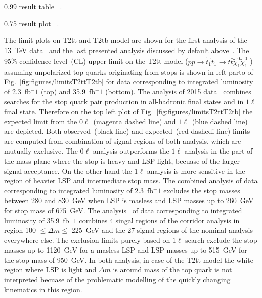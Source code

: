                  {0.99}       %
                 { result table ~\cite{Sirunyan:2017xse}. }

                 {0.75}       %
                 { result plot ~\cite{Sirunyan:2017xse}. }

The limit plots on T2tt and T2tb model are shown for the first analysis of the 13~TeV data~\cite{Sirunyan:2016jpr} and the last presented analysis discussed by default above~\cite{Sirunyan:2017xse}. The 95\% confidence level~(CL) upper limit on the T2tt model ($ pp \to \tilde{t}_{1} \bar{\tilde{t}}_{1} \to t \bar{t} \tilde{\chi}^{0}_{1} \tilde{\chi}^{0}_{1}$ ) assuming unpolarized top quarks originating from stops is shown in left parto of Fig.~\ref{fig:figures/limitsT2ttT2tb} for data corresponding to integrated luminosity of 2.3~fb$^-1$ (top) and 35.9~fb$^-1$ (bottom). The analysis of 2015 data~\cite{Sirunyan:2016jpr} combines searches for the stop quark pair production in all-hadronic final states and in $1\ell$ final state. Therefore on the top left plot of Fig.~\ref{fig:figures/limitsT2ttT2tb} the expected limit from the $0\ell$~(magenta dashed line) and $1\ell$~(blue dashed line) are depicted. Both observed~(black line) and expected~(red dashedi line) limits are computed from combination of signal regions of both analysis, which are mutually exclusive. The $0\ell$ analysis outperforms the $1\ell$ analysis in the part of the mass plane where the stop is heavy and LSP light, becuase of the larger signal acceptance. On the other hand the $1\ell$ analysis is more sensitive in the region of heavier LSP and intermediate stop mass. The combined analysis of data corresponding to integrated luminosity of 2.3~fb$^-1$ excludes the stop masses between 280 and 830~GeV when LSP is masless and LSP masses up to 260~GeV for stop mass of 675~GeV. The analysis~\cite{Sirunyan:2017xse} of data corresponding to integrated luminosity of 35.9~fb$^-1$ combines 4 singal regions of the corridor analysis in region 100 $\leq \Delta m \leq $ 225~GeV and the 27 signal regions of the nominal analysis everywhere else. The exclusion limits purely based on $1\ell$ search exclude  the stop masses up to 1120~GeV for a masless LSP and LSP masses up to 515~GeV for the stop mass of 950~GeV. In both analysis, in case of the T2tt model the white region where LSP is light and $\Delta m$ is around mass of the top quark is not interpreted becuase of the problematic modelling of the quickly changing kinematics in this region.

